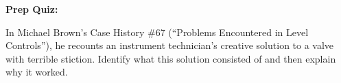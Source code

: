 \vfil \eject

\noindent
{\bf Prep Quiz:}

In Michael Brown's Case History \#67 (``Problems Encountered in Level Controls''), he recounts an instrument technician's creative solution to a valve with terrible stiction.  Identify what this solution consisted of and then explain why it worked.






